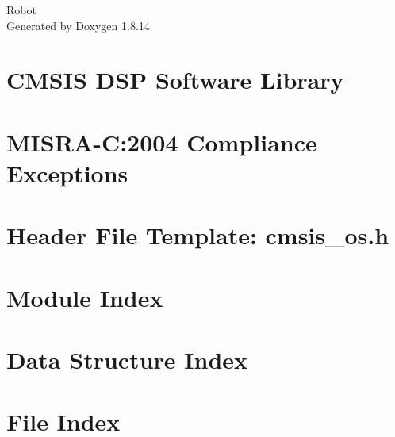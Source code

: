 \documentclass[twoside]{book}
\newcommand{\+}{\discretionary{\mbox{\scriptsize$\hookleftarrow$}}{}{}}
\newcommand{\clearemptydoublepage}{%
  \newpage{\pagestyle{empty}\cleardoublepage}%
}
\begin{document}
\hypersetup{pageanchor=false,
             bookmarksnumbered=true,
             pdfencoding=unicode
            }
\begin{titlepage}
\vspace*{7cm}
\begin{center}%
{\Large Robot }\\
\vspace*{1cm}
{\large Generated by Doxygen 1.8.14}\\
\end{center}
\end{titlepage}
\clearemptydoublepage
{}
\tableofcontents
\clearemptydoublepage
{}
\hypersetup{pageanchor=true}

\chapter{C\+M\+S\+IS D\+SP Software Library}
\label{index}\hypertarget{index}{}
\chapter{M\+I\+S\+R\+A-\/C\+:2004 Compliance Exceptions}
\label{_c_m_s_i_s__m_i_s_r_a__exceptions}

\chapter{Header File Template\+: cmsis\+\_\+os.\+h}
\label{cmsis_os_h}

\chapter{Module Index}

\chapter{Data Structure Index}

\chapter{File Index}

\end{document}
